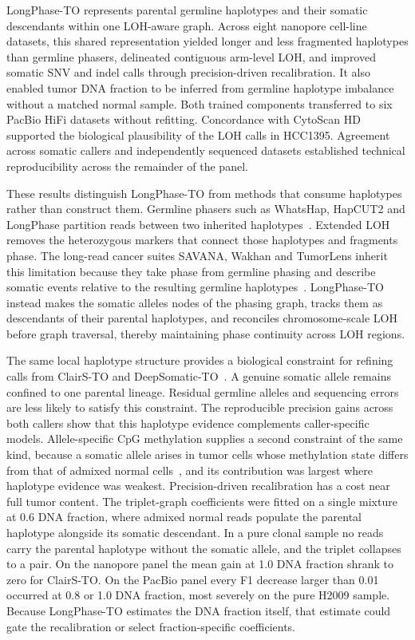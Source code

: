 \documentclass[pdflatex,sn-nature]{sn-jnl}
\begin{document}
LongPhase-TO represents parental germline haplotypes and their somatic descendants within one LOH-aware graph. Across eight nanopore cell-line datasets, this shared representation yielded longer and less fragmented haplotypes than germline phasers, delineated contiguous arm-level LOH, and improved somatic SNV and indel calls through precision-driven recalibration. It also enabled tumor DNA fraction to be inferred from germline haplotype imbalance without a matched normal sample. Both trained components transferred to six PacBio HiFi datasets without refitting. Concordance with CytoScan HD supported the biological plausibility of the LOH calls in HCC1395. Agreement across somatic callers and independently sequenced datasets established technical reproducibility across the remainder of the panel.

These results distinguish LongPhase-TO from methods that consume haplotypes rather than construct them. Germline phasers such as WhatsHap, HapCUT2 and LongPhase partition reads between two inherited haplotypes~\cite{martin2016,edge2017,lin2022}. Extended LOH removes the heterozygous markers that connect those haplotypes and fragments phase. The long-read cancer suites SAVANA, Wakhan and TumorLens inherit this limitation because they take phase from germline phasing and describe somatic events relative to the resulting germline haplotypes~\cite{elrick2025,ahmad2025,paulin2026}. LongPhase-TO instead makes the somatic alleles nodes of the phasing graph, tracks them as descendants of their parental haplotypes, and reconciles chromosome-scale LOH before graph traversal, thereby maintaining phase continuity across LOH regions.

The same local haplotype structure provides a biological constraint for refining calls from ClairS-TO and DeepSomatic-TO~\cite{park2024,chen2025}. A genuine somatic allele remains confined to one parental lineage. Residual germline alleles and sequencing errors are less likely to satisfy this constraint. The reproducible precision gains across both callers show that this haplotype evidence complements caller-specific models. Allele-specific CpG methylation supplies a second constraint of the same kind, because a somatic allele arises in tumor cells whose methylation state differs from that of admixed normal cells~\cite{recillastarga2022,zheng2017,zhang2015}, and its contribution was largest where haplotype evidence was weakest. Precision-driven recalibration has a cost near full tumor content. The triplet-graph coefficients were fitted on a single mixture at 0.6 DNA fraction, where admixed normal reads populate the parental haplotype alongside its somatic descendant. In a pure clonal sample no reads carry the parental haplotype without the somatic allele, and the triplet collapses to a pair. On the nanopore panel the mean gain at 1.0 DNA fraction shrank to zero for ClairS-TO. On the PacBio panel every F1 decrease larger than 0.01 occurred at 0.8 or 1.0 DNA fraction, most severely on the pure H2009 sample. Because LongPhase-TO estimates the DNA fraction itself, that estimate could gate the recalibration or select fraction-specific coefficients.
\end{document}
